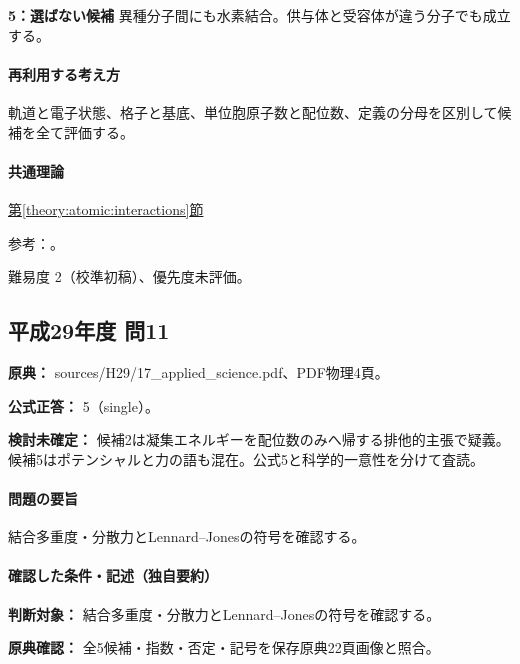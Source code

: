 \noindent\textbf{5：選ばない候補} 異種分子間にも水素結合。供与体と受容体が違う分子でも成立する。\par

\paragraph{再利用する考え方} 軌道と電子状態、格子と基底、単位胞原子数と配位数、定義の分母を区別して候補を全て評価する。

\paragraph{共通理論} \hyperref[theory:atomic:interactions]{第\ref*{theory:atomic:interactions}節}

\par 参考：\cite{atomic_nonbond}。

\par 難易度 2（校準初稿）、優先度未評価。

\subsection{平成29年度 問11}
\label{q:h29-reg-applied-11}

\noindent\textbf{原典：} sources/H29/17\_applied\_science.pdf、PDF物理4頁。

\textbf{公式正答：} 5（single）。

\par\textbf{検討未確定：} 候補2は凝集エネルギーを配位数のみへ帰する排他的主張で疑義。候補5はポテンシャルと力の語も混在。公式5と科学的一意性を分けて査読。

\paragraph{問題の要旨} 結合多重度・分散力とLennard–Jonesの符号を確認する。

\paragraph{確認した条件・記述（独自要約）}\mbox{}\par

\noindent\textbf{判断対象：} 結合多重度・分散力とLennard–Jonesの符号を確認する。\par

\noindent\textbf{原典確認：} 全5候補・指数・否定・記号を保存原典22頁画像と照合。\par

